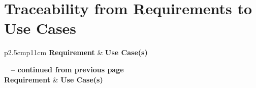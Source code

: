 \documentclass[12pt]{article}
\begin{document}
\section{Traceability from Requirements to Use Cases}
\begin{longtable}{p{2.5cm}p{11cm}}
  \toprule
  \textbf{Requirement} & \textbf{Use Case(s)} \\
  \midrule
  \endfirsthead

  {{\bfseries \tablename\ \thetable{} -- continued from previous page}} \\
  \toprule
  \textbf{Requirement} & \textbf{Use Case(s)} \\
  \midrule
  \endhead

  \midrule
   \\
  \endfoot

  \bottomrule
  \endlastfoot


\end{longtable}
\end{document}
